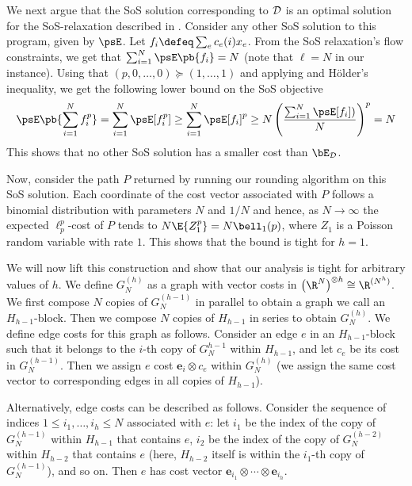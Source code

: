 \documentclass[11pt,a4paper]{article}
\begin{document}
We next argue that the SoS solution corresponding to \(\cal D\)
is an optimal solution for the SoS-relaxation described in .
Consider any other SoS solution to this program, given by \(\psE\).
Let \(f_i \defeq \sum_e c_e(i) x_e\). 
From the SoS relaxation's flow constraints, we get that \(\sum_{i=1}^N \psE\pb{f_i} = N\) (note that $\ell= N$ in our instance).
Using that \((p,0,\dots,0) \succeq (1, \ldots, 1)\) and applying  and H\"older's inequality, we get the following lower bound on the SoS objective
\begin{align*}
\psE\pb{\sum_{i=1}^N f_i^p} = \sum_{i=1}^N \psE[f_i^p] \ge \sum_{i=1}^N \psE[f_i]^p \geq
N\left(\frac{\sum_{i=1}^N \psE[f_i])}{N}\right)^p = N
\end{align*}
This shows that no other SoS solution has a smaller cost than \(\bE_{\cal D}\).

Now, consider the path $P$ returned by running our rounding algorithm on this SoS solution. Each coordinate of the cost vector associated with $P$ follows a binomial distribution with parameters $N$ and $1/N$ and hence, as $N\to \infty$ the expected $\ell_p^p$-cost of $P$ tends to $N \E{Z_1^p} = N \bell_1(p)$, where $Z_1$ is a Poisson random variable with rate $1$. This shows that the bound is tight for $h=1$.

We will now lift this construction and show that our analysis is tight for arbitrary values of $h$. We define $G^{(h)}_N$ as a graph with vector costs in $\bigl(\R^N\bigr)^{\otimes h} \cong \R^{(N^h)}$. We first compose $N$ copies of $G^{(h-1)}_N$ in parallel to obtain a graph we call an $H_{h-1}$-block. Then we compose $N$ copies of $H_{h-1}$ in series to obtain $G^{(h)}_N$.
We define edge costs for this graph as follows. 
Consider an edge $e$ in an $H_{h-1}$-block such that it belongs to the $i$-th copy of $G_N^{h-1}$ within \(H_{h-1}\), and let \(c_e\) be its cost in $G_N^{(h-1)}$. Then we assign $e$ cost $\mathbf{e}_i\otimes c_e$ within \(G_N^{(h)}\) (we assign the same cost vector to corresponding edges in all copies of $H_{h-1}$).

Alternatively, edge costs can be described as follows. Consider the sequence of indices \(1 \le i_1, \ldots, i_h \le N\)
associated with \(e\): let \(i_1\) be the index of the copy of \(G_N^{(h-1)}\) within \(H_{h-1}\) that contains $e$,  \(i_2\) be the index of the copy of \(G_N^{(h-2)}\) within \(H_{h-2}\) that contains $e$ (here, \(H_{h-2}\) itself is within the \(i_1\)-th copy of \(G_N^{(h-1)}\)), and so on.
Then \(e\) has cost vector \(\mathbf{e}_{i_1} \otimes \cdots \otimes \mathbf{e}_{i_h}\).
\end{document}

